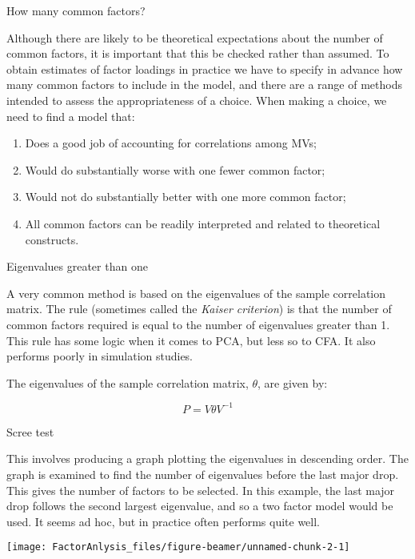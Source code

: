 \documentclass[10pt,ignorenonframetext,]{beamer}
\providecommand{\tightlist}{%
  \setlength{\itemsep}{0pt}\setlength{\parskip}{0pt}}
\begin{document}
\begin{frame}{How many common factors?}

Although there are likely to be theoretical expectations about the
number of common factors, it is important that this be checked rather
than assumed. To obtain estimates of factor loadings in practice we have
to specify in advance how many common factors to include in the model,
and there are a range of methods intended to assess the appropriateness
of a choice. When making a choice, we need to find a model that:

\begin{enumerate}
\def\labelenumi{\arabic{enumi}.}
\tightlist
\item
  Does a good job of accounting for correlations among MVs;
\item
  Would do substantially worse with one fewer common factor;
\item
  Would not do substantially better with one more common factor;
\item
  All common factors can be readily interpreted and related to
  theoretical constructs.
\end{enumerate}

\end{frame}

\begin{frame}{Eigenvalues greater than one}

A very common method is based on the eigenvalues of the sample
correlation matrix. The rule (sometimes called the \emph{Kaiser
criterion}) is that the number of common factors required is equal to
the number of eigenvalues greater than 1. This rule has some logic when
it comes to PCA, but less so to CFA. It also performs poorly in
simulation studies.

The eigenvalues of the sample correlation matrix, \(\theta\), are given
by:

\[
P = V \theta V^{-1}
\]

\end{frame}

\begin{frame}{Scree test}

This involves producing a graph plotting the eigenvalues in descending
order. The graph is examined to find the number of eigenvalues before
the last major drop. This gives the number of factors to be selected. In
this example, the last major drop follows the second largest eigenvalue,
and so a two factor model would be used. It seems ad hoc, but in
practice often performs quite well.

\texttt{[image: FactorAnlysis\_files/figure-beamer/unnamed-chunk-2-1]}

\end{frame}
\end{document}
